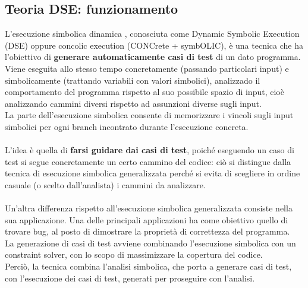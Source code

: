 \documentclass[a4paper, 12pt, oneside]{book}
\theoremstyle{normal}
\begin{document}
\subsection{Teoria DSE: funzionamento}
L'esecuzione simbolica dinamica \cite{araki2018systematic, enwiki:1151336533}, conosciuta come Dynamic Symbolic Execution (DSE) oppure concolic execution (CONCrete + symbOLIC), è una tecnica che ha l'obiettivo di \textbf{generare automaticamente casi di test} di un dato programma. Viene eseguita allo stesso tempo concretamente (passando particolari input) e simbolicamente (trattando variabili con valori simbolici), analizzado il comportamento del programma rispetto al suo possibile spazio di input, cioè analizzando cammini diversi rispetto ad assunzioni diverse sugli input. \\ La parte dell'esecuzione simbolica consente di memorizzare i vincoli sugli input simbolici per ogni branch incontrato durante l'esecuzione concreta.
\\ \\ L'idea è quella di \textbf{farsi guidare dai casi di test}, poiché eseguendo un caso di test si segue concretamente un certo cammino del codice: ciò si distingue dalla tecnica di esecuzione simbolica generalizzata perché si evita di scegliere in ordine casuale (o scelto dall'analista) i cammini da analizzare.
\\ \\ Un'altra differenza rispetto all'esecuzione simbolica generalizzata consiste nella sua applicazione. Una delle principali applicazioni ha come obiettivo quello di trovare bug, al posto di dimostrare la proprietà di correttezza del programma. \\ La generazione di casi di test avviene combinando l'esecuzione simbolica con un constraint solver, con lo scopo di massimizzare la copertura del codice. \\ Perciò, la tecnica combina l'analisi simbolica, che porta a generare casi di test, con l'esecuzione dei casi di test, generati per proseguire con l'analisi. 
\end{document}
